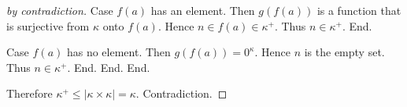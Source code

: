 \documentclass{article}
\begin{document}
\begin{forthel}
\begin{proof}[by contradiction]
          Case $f(a)$ has an element.
            Then $g(f(a))$ is a function that is surjective from $\kappa$ onto
            $f(a)$.
            Hence $n \in f(a) \in \kappa^{+}$.
            Thus $n \in \kappa^{+}$.
          End.

          Case $f(a)$ has no element.
            Then $g(f(a)) = 0^{\kappa}$.
            Hence $n$ is the empty set.
            Thus $n \in \kappa^{+}$.
          End.
        End.
      End.

      Therefore $\kappa^{+} \leq |\kappa \times \kappa| = \kappa$.
      Contradiction.
    \end{proof}
  \end{forthel}

  \printbibliography
\end{document}
